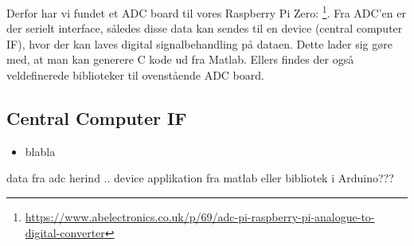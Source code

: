 Derfor har vi fundet et ADC board til vores Raspberry Pi Zero: \footnote{\url{https://www.abelectronics.co.uk/p/69/adc-pi-raspberry-pi-analogue-to-digital-converter}}. Fra ADC'en er der serielt interface, således disse data kan sendes til en device (central computer IF), hvor der kan laves digital signalbehandling på dataen. Dette lader sig gøre med, at man kan generere C kode ud fra Matlab. Ellers findes der også veldefinerede biblioteker til ovenstående ADC board. 

\subsection{Central Computer IF}
\begin{itemize}
    \item blabla
\end{itemize}
data fra adc herind .. device applikation fra matlab eller bibliotek i Arduino???
